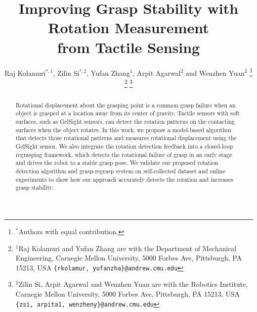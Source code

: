 \documentclass[letterpaper, 10 pt, conference]{ieeeconf}  %
\title{\LARGE \bf
Improving Grasp Stability with Rotation Measurement \\from Tactile Sensing
}
\author{Raj Kolamuri$^{*,1}$, Zilin Si$^{*,2}$, Yufan Zhang$^{1}$, Arpit Agarwal$^{2}$ and Wenzhen Yuan$^{2}$%
\thanks{$^{*}$Authors with equal contribution.}%
\thanks{$^{1}$Raj Kolamuri and Yufan Zhang are with the Department of Mechanical Engineering, Carnegie Mellon University, 5000 Forbes Ave, Pittsburgh, PA 15213, USA
        {\tt\small \{rkolamur, yufanzha\}@andrew.cmu.edu}}%
\thanks{$^{2}$Zilin Si, Arpit Agarwal and Wenzhen Yuan are with the Robotics Institute, Carnegie Mellon University, 5000 Forbes Ave, Pittsburgh, PA 15213, USA
        {\tt\small \{zsi, arpita1, wenzheny\}@andrew.cmu.edu}}%
}
\begin{document}
\maketitle
\thispagestyle{empty}
\pagestyle{empty}


\begin{abstract}


Rotational displacement about the grasping point is a common grasp failure when an object is grasped at a location away from its center of gravity. Tactile sensors with soft surfaces, such as GelSight sensors, can detect the rotation patterns on the contacting surfaces when the object rotates. In this work, we propose a model-based algorithm that detects those rotational patterns and measures rotational displacement using the GelSight sensor. We also integrate the rotation detection feedback into a closed-loop regrasping framework, which detects the rotational failure of grasp in an early stage and drives the robot to a stable grasp pose. We validate our proposed rotation detection algorithm and grasp-regrasp system on self-collected dataset and online experiments to show how our approach accurately detects the rotation and increases grasp stability. 


\end{abstract}
\end{document}

